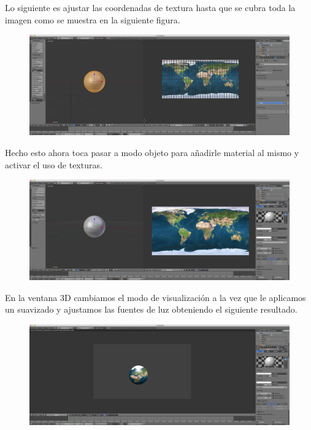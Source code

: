 \documentclass[10pt]{article}
\begin{document}
Lo siguiente es ajustar las coordenadas de textura hasta que se cubra toda la imagen como se muestra en la siguiente figura. \\

\begin{figure}[H]
	\begin{center}
	 		\includegraphics[width = 1.00\textwidth]{Imagenes/p3-img5}
	\end{center} 
\end{figure}

Hecho esto ahora toca pasar a modo objeto para añadirle material al mismo y activar el uso de texturas.

\begin{figure}[H]
	\begin{center}
	 		\includegraphics[width = 1.00\textwidth]{Imagenes/p3-img6}
	\end{center} 
\end{figure}

En la ventana 3D cambiamos el modo de visualización a la vez que le aplicamos un suavizado y ajustamos las fuentes de luz obteniendo el siguiente resultado.

\begin{figure}[H]
	\begin{center}
	 		\includegraphics[width = 1.00\textwidth]{Imagenes/p3-img7}
	\end{center} 
\end{figure}
\end{document}

